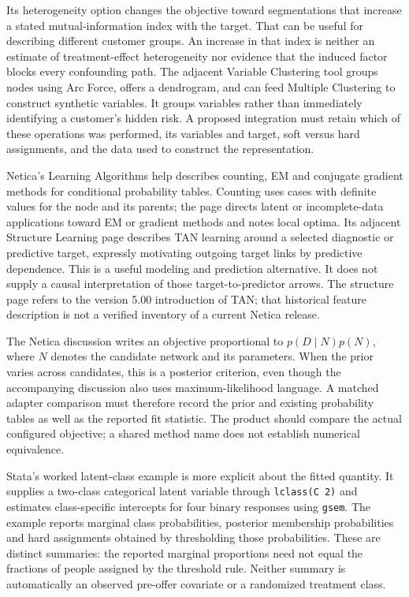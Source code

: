 Its heterogeneity option changes the objective toward segmentations that
increase a stated mutual-information index with the target. That can be
useful for describing different customer groups. An increase in that
index is neither an estimate of treatment-effect heterogeneity nor
evidence that the induced factor blocks every confounding path. The
adjacent Variable Clustering tool groups nodes using Arc Force, offers a
dendrogram, and can feed Multiple Clustering to construct synthetic
variables. It groups variables rather than immediately identifying a
customer's hidden risk. A proposed integration must retain which of
these operations was performed, its variables and target, soft versus
hard assignments, and the data used to construct the representation.
\citep{exec13_latent_bayesia_data,exec13_latent_bayesia_variables}

Netica's Learning Algorithms help describes counting, EM and conjugate
gradient methods for conditional probability tables. Counting uses cases
with definite values for the node and its parents; the page directs
latent or incomplete-data applications toward EM or gradient methods and
notes local optima. Its adjacent Structure Learning page describes TAN
learning around a selected diagnostic or predictive target, expressly
motivating outgoing target links by predictive dependence. This is a
useful modeling and prediction alternative. It does not supply a causal
interpretation of those target-to-predictor arrows. The structure page
refers to the version 5.00 introduction of TAN; that historical feature
description is not a verified inventory of a current Netica release.
\citep{exec13_latent_netica_algorithms,exec13_latent_netica_structure}

The Netica discussion writes an objective proportional to
\(p(D\mid N)p(N)\), where \(N\) denotes the candidate network and its
parameters. When the prior varies across candidates, this is a posterior
criterion, even though the accompanying discussion also uses
maximum-likelihood language. A matched adapter comparison must therefore
record the prior and existing probability tables as well as the reported
fit statistic. The product should compare the actual configured
objective; a shared method name does not establish numerical
equivalence. \citep{exec13_latent_netica_algorithms}

Stata's worked latent-class example is more explicit about the fitted
quantity. It supplies a two-class categorical latent variable through
\texttt{lclass(C 2)} and estimates class-specific intercepts for four
binary responses using \texttt{gsem}. The example reports marginal class
probabilities, posterior membership probabilities and hard assignments
obtained by thresholding those probabilities. These are distinct
summaries: the reported marginal proportions need not equal the
fractions of people assigned by the threshold rule. Neither summary is
automatically an observed pre-offer covariate or a randomized treatment
class. \citep[pp.2--6]{exec13_latent_stata_lca}

